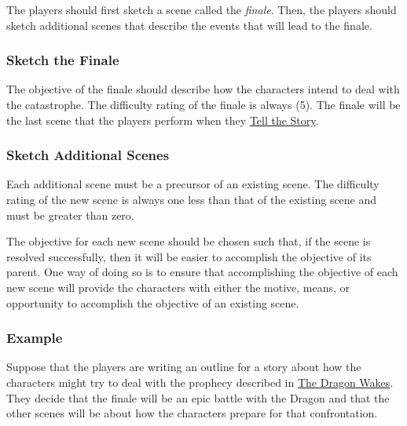 \documentclass[12pt, a5paper, parskip=half-, footheight=1.4cm]{scrartcl}
\begin{document}
The players should first sketch a scene called the \emph{finale}.
Then, the players should sketch additional scenes that describe the events that will lead to the finale.

\subsubsection*{Sketch the Finale} \label{subsubsection:sketch-the-finale}
The objective of the finale should describe how the characters intend to deal with the catastrophe.
The difficulty rating of the finale is always (5).
The finale will be the last scene that the players perform when they \hyperref[subsection:tell-the-story]{\cinzel \small Tell the Story}.

\subsubsection*{Sketch Additional Scenes} \label{subsubsection:sketch-additional-scenes}
Each additional scene must be a precursor of an existing scene.
The difficulty rating of the new scene is always one less than that of the existing scene and must be greater than zero.

The objective for each new scene should be chosen such that, if the scene is resolved successfully, then it will be easier to accomplish the objective of its parent. One way of doing so is to ensure that accomplishing the objective of each new scene will provide the characters with either the motive, means, or opportunity to accomplish the objective of an existing scene.

\newpage

\subsubsection*{Example} \label{example:write-an-outline}
Suppose that the players are writing an outline for a story about how the characters might try to deal with the prophecy described in \hyperref[section:the-dragon-wakes]{\cinzel \small The Dragon Wakes}.  They decide that the finale will be an epic battle with the Dragon and that the other scenes will be about how the characters prepare for that confrontation.
\end{document}
